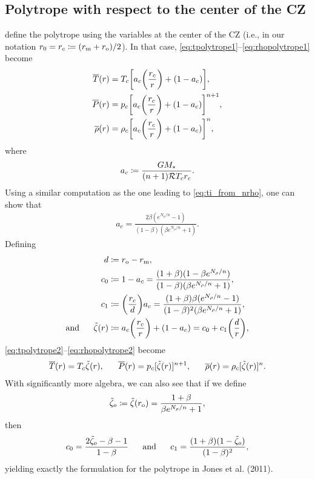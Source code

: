 \documentclass[12pt]{article} %
\newcommand{\rrm}{r_{\rm{m}}}
\newcommand{\tz}{\tilde{\zeta}}
\begin{document}
\subsection{Polytrope with respect to the center of the CZ}
\citet{Jones11} define the polytrope using the variables at the center of the CZ (i.e., in our notation $r_0=r_c\coloneqq(\rrm+r_{\rm{o}})/2$). In that case, \eqref{eq:tpolytrope1}--\eqref{eq:rhopolytrope1} become
\begin{align}
	\overline{T}(r) &= T_c\bigg{[}a_c\bigg{(}\frac{r_c}{r}\bigg{)} + (1 - a_c)\bigg{]},\label{eq:tpolytrope2}\\
	\overline{P}(r) &= p_c\bigg{[}a_c\bigg{(}\frac{r_c}{r}\bigg{)} + (1 - a_c)\bigg{]}^{n+1},\label{eq:ppolytrope2}\\
	\overline{\rho}(r) &= \rho_c\bigg{[}a_c\bigg{(}\frac{r_c}{r}\bigg{)} + (1 - a_c)\bigg{]}^n,\label{eq:rhopolytrope2}
\end{align} 
where 
\begin{align}
a_c \coloneqq \frac{GM_*}{(n+1)\mathcal{R} T_c r_c}.
\label{def:ac}
\end{align}
Using a similar computation as the one leading to \eqref{eq:ti_from_nrho}, one can show that 
\begin{align}
a_c = \frac{2\beta(e^{N_\rho/n}-1)}{(1-\beta)(\beta e^{N_\rho/n} + 1)}.
\label{eq:ac_fromn}
\end{align}
Defining 
\begin{align}
d&\coloneqq r_{\rm{o}}-\rrm,\label{def:d}\\
c_0&\coloneqq 1-a_c = \frac{(1+\beta)(1-\beta e^{N_\rho/n})}{(1-\beta)(\beta e^{N_\rho/n} + 1)}, \label{def:c0}\\
c_1&\coloneqq \bigg{(}\frac{r_c}{d}\bigg{)}a_c = \frac{(1+\beta)\beta(e^{N_\rho/n}-1)}{(1-\beta)^2(\beta e^{N_\rho/n} + 1)},\label{def:c1}\\
\andd \tz(r) &\coloneqq a_c\bigg{(}\frac{r_c}{r}\bigg{)} + (1-a_c) = c_0 + c_1\bigg{(}\frac{d}{r}\bigg{)},\label{def:tildezeta}
\end{align}
\eqref{eq:tpolytrope2}--\eqref{eq:rhopolytrope2} become
\begin{align}
\tmpref\ofr=T_c\tz(r),\ \ \ \ \ \prsref\ofr=p_c[\tz(r)]^{n+1},\ \ \ \ \ \rhoref\ofr=\rho_c[\tz(r)]^n. 
\label{eq:polytrope3}
\end{align}
With significantly more algebra, we can also see that if we define
\begin{align}
\tz_o \coloneqq \tz(r_{\rm{o}}) = \frac{1+\beta}{\beta e^{N_\rho/n} + 1}, 
\end{align}
then 
\begin{align}
c_0 = \frac{2\tz_o - \beta - 1}{1-\beta} \ \ \ \ \ \andd c_1 = \frac{(1+\beta)(1-\tz_o)}{(1-\beta)^2},
\label{eq:c01_from_zeta0}
\end{align}
yielding exactly the formulation for the polytrope in Jones et al. (2011). 
\end{document}

